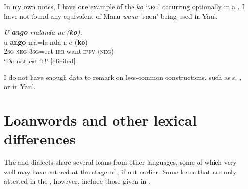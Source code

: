In my own notes, I have one example of the  \textit{ko} ‘\textsc{neg}’ occurring optionally in a  . I have not found any equivalent of Manu \textit{wana} ‘\textsc{proh}’ being used in Yaul.

\ea%
    \label{ex:mdy:21}
          \textit{U \textbf{ango} malanda ne (\textbf{ko}).}\\
    \gll u    \textbf{ango}  ma=la-nda    n-e      (\textbf{ko})\\
    2\textsc{sg}  \textsc{neg}  3\textsc{sg}=eat-\textsc{irr}  want-\textsc{ipfv}  (\textsc{neg})\\
    \glt ‘Do not eat it!’ [elicited]
\z

I do not have enough data to remark on less-common  constructions, such as s, , or  in Yaul.


\newpage

\section{\label{sec:18.6}  {Loanwords and other lexical differences}}


The  and  dialects share several loans from other languages, some of which very well may have entered at the stage of , if not earlier. Some loans that are only attested in the  , however, include those given in .


